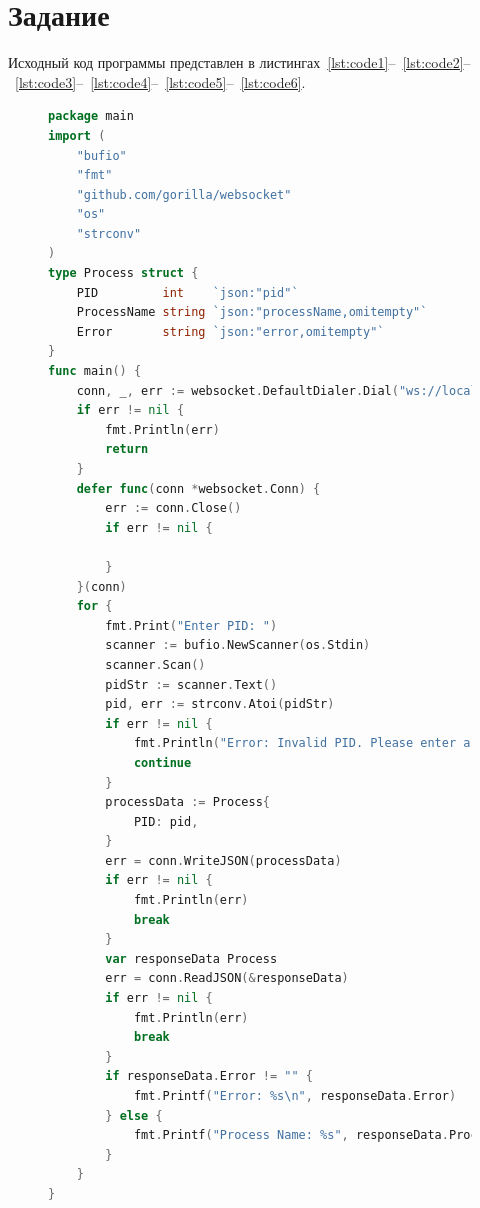 \documentclass[a4paper, 14pt]{extarticle}
\begin{document}
\renewcommand{\ttdefault}{pcr}

\setlength{\tabcolsep}{3pt}
\newpage
\setcounter{page}{2}
\section{Задание}\label{Sect::task}

Исходный код программы представлен в листингах~\ref{lst:code1}--~\ref{lst:code2}--~\ref{lst:code3}--~\ref{lst:code4}--~\ref{lst:code5}--~\ref{lst:code6}.

\begin{figure}[!htb]
\begin{lstlisting}[language={Go},caption={client.go},label={lst:code1}]
package main
import (
	"bufio"
	"fmt"
	"github.com/gorilla/websocket"
	"os"
	"strconv"
)
type Process struct {
	PID         int    `json:"pid"`
	ProcessName string `json:"processName,omitempty"`
	Error       string `json:"error,omitempty"`
}
func main() {
	conn, _, err := websocket.DefaultDialer.Dial("ws://localhost:8080", nil)
	if err != nil {
		fmt.Println(err)
		return
	}
	defer func(conn *websocket.Conn) {
		err := conn.Close()
		if err != nil {

		}
	}(conn)
	for {
		fmt.Print("Enter PID: ")
		scanner := bufio.NewScanner(os.Stdin)
		scanner.Scan()
		pidStr := scanner.Text()
		pid, err := strconv.Atoi(pidStr)
		if err != nil {
			fmt.Println("Error: Invalid PID. Please enter a valid number.")
			continue
		}
		processData := Process{
			PID: pid,
		}
		err = conn.WriteJSON(processData)
		if err != nil {
			fmt.Println(err)
			break
		}
		var responseData Process
		err = conn.ReadJSON(&responseData)
		if err != nil {
			fmt.Println(err)
			break
		}
		if responseData.Error != "" {
			fmt.Printf("Error: %s\n", responseData.Error)
		} else {
			fmt.Printf("Process Name: %s", responseData.ProcessName)
		}
	}
}

\end{lstlisting}
\end{figure}

\newpage
\end{document}
